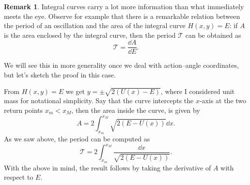 \documentclass[english,fontsize=11pt,paper=b5]{scrbook}
\numberwithin{equation}{chapter}
\theoremstyle{definition}
\newtheorem{remark}{Remark}[chapter]
\begin{document}
    \begin{remark}
      Integral curves carry a lot more information than what immediately meets the eye.
      Observe for example that there is a remarkable relation between the period of an oscillation and the area of the integral curve $H(x,y) = E$:
      if $A$ is the area enclosed by the integral curve, then the period $\mathcal{T}$ can be obtained as
      \begin{equation}
        \mathcal{T} = \frac{\dd A}{\dd E}.
      \end{equation}

      We will see this in more generality once we deal with action--angle coordinates, but let's sketch the proof in this case.

      From $H(x,y) = E$ we get $y = \pm \sqrt{2(U(x) - E)}$, where I considered unit mass for notational simplicity. Say that the curve intercepts the $x$-axis at the two return points $x_m < x_M$, then the area inside the curve, is given by
      \begin{equation}
        A = 2\int_{x_m}^{x_M}\sqrt{2(E - U(x))} \dd x.
      \end{equation}
      As we saw above, the period can be computed as
      \begin{equation}
        \mathcal{T} = 2\int_{x_m}^{x_M} \frac{\dd x}{\sqrt{2(E - U(x))}}.
      \end{equation}
      With the above in mind, the result follows by taking the derivative of $A$ with respect to $E$.
    \end{remark}
\end{document}
